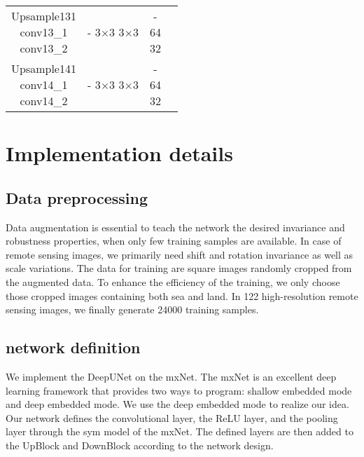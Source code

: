 \documentclass[conference]{IEEEtran}
\begin{document}
\begin{table}[h]
\begin{tabular}{|c|c|c|c|}
	\cline{1-3}
	\tabincell{c}{Upsample131\\conv13\_1\\conv13\_2} & \tabincell{c}{-\\3$\times$3\\3$\times$3} & \tabincell{c}{-\\64\\32} & \\
	\cline{1-3}
	\tabincell{c}{Upsample141\\conv14\_1\\conv14\_2} & \tabincell{c}{-\\3$\times$3\\3$\times$3} & \tabincell{c}{-\\64\\32} & \\
	\hline
	\end{tabular}
\label{table1}
\end{table}

\section{Implementation details}
\subsection{Data preprocessing}

Data augmentation is essential to teach the network the desired invariance and robustness properties, when only few training samples are available. In case of remote sensing images, we primarily need shift and rotation invariance as well as scale variations. The data for training are square images randomly cropped from the augmented data. To enhance the efficiency of the training, we only choose those cropped images containing both sea and land. In 122 high-resolution remote sensing images, we finally generate 24000 training samples.

\subsection{network definition}

We implement the DeepUNet on the mxNet\cite{b21}. The mxNet is an excellent deep learning framework that provides two ways to program: shallow embedded mode and deep embedded mode. We use the deep embedded mode to realize our idea.\\

Our network defines the convolutional layer, the ReLU layer, and the pooling layer through the sym model of the mxNet. The defined layers are then added to the UpBlock and DownBlock according to the network design.
\end{document}
